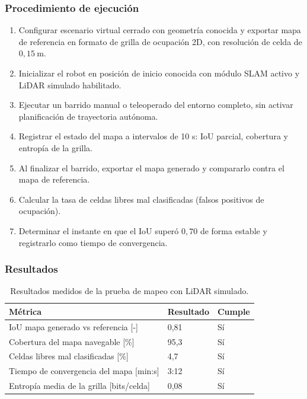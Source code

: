 \subsubsection{Procedimiento de ejecución}

\begin{enumerate}
    \item Configurar escenario virtual cerrado con geometría conocida y exportar mapa de referencia en formato de grilla de ocupación 2D, con resolución de celda de $0{,}15\ \text{m}$.
    \item Inicializar el robot en posición de inicio conocida con módulo SLAM activo y LiDAR simulado habilitado.
    \item Ejecutar un barrido manual o teleoperado del entorno completo, sin activar planificación de trayectoria autónoma.
    \item Registrar el estado del mapa a intervalos de 10 s: IoU parcial, cobertura y entropía de la grilla.
    \item Al finalizar el barrido, exportar el mapa generado y compararlo contra el mapa de referencia.
    \item Calcular la tasa de celdas libres mal clasificadas (falsos positivos de ocupación).
    \item Determinar el instante en que el IoU superó $0{,}70$ de forma estable y registrarlo como tiempo de convergencia.
\end{enumerate}

\subsubsection{Resultados}

\begin{table}[H]
\centering
\small
\begin{tabular}{p{8.8cm} p{2.2cm} p{2.8cm}}
\toprule
\textbf{Métrica} & \textbf{Resultado} & \textbf{Cumple} \\
\midrule
IoU mapa generado vs referencia [-] & 0,81 & Sí \\
Cobertura del mapa navegable [\%] & 95,3 & Sí \\
Celdas libres mal clasificadas [\%] & 4,7 & Sí \\
Tiempo de convergencia del mapa [min:s] & 3:12 & Sí \\
Entropía media de la grilla [bits/celda] & 0,08 & Sí \\
\bottomrule
\end{tabular}
\caption{Resultados medidos de la prueba de mapeo con LiDAR simulado.}
\label{tab:resultados_prueba_slam}
\end{table}

